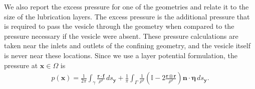 \documentclass[twoside,twocolumn,9pt]{article}
\newcommand{\ff}{\mathbf{f}}
\newcommand{\eeta}{\boldsymbol{\eta}}
\newcommand{\nn}{\mathbf{n}}
\newcommand{\rr}{\mathbf{r}}
\renewcommand{\ss}{\mathbf{s}}
\newcommand{\uu}{\mathbf{u}}
\newcommand{\xx}{\mathbf{x}}
\newcommand{\yy}{\mathbf{y}}
\begin{document}
We also report the excess pressure for one of the geometries and relate
it to the size of the lubrication layers. The excess pressure is the
additional pressure that is required to pass the vesicle through the
geometry when compared to the pressure necessary if the vesicle were
absent. These pressure calculations are taken near the inlets and
outlets of the confining geometry, and the vesicle itself is never near
these locations. Since we use a layer potential formulation, the
pressure at $\xx \in \Omega$ is
\begin{align}
  p(\xx) = \frac{1}{2\pi} \int_{\gamma} \frac{\rr \cdot \ff}{\rho^2} \, ds_\yy + 
    \frac{1}{\pi} \int_{\Gamma} \frac{1}{\rho^2} 
    \left(\mathds{I} - 2\frac{\rr \otimes \rr}{\rho^2} \right) 
    \nn \cdot \eeta \, ds_\yy.
\end{align}


\end{document}
